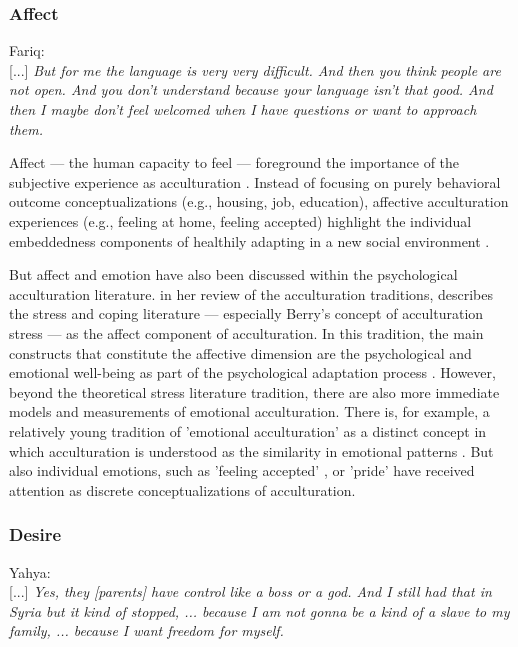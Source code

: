\documentclass[man, 12pt, a4paper, mask]{apa7}
\begin{document}
\subsubsection{Affect}
\begin{displayquote}
    Fariq:\\
    {[...]} \textit{But for me the language is very very difficult. And then you think people are not open. And you don't understand because your language isn't that good. And then I maybe don't feel welcomed when I have questions or want to approach them.}
\end{displayquote}

Affect --- the human capacity to feel \citep[including emotions and moods;][]{FeldmanBarrett2007} --- foreground the importance of the subjective experience as acculturation \citep[][]{Holodynski2012}. Instead of focusing on purely behavioral outcome conceptualizations (e.g., housing, job, education), affective acculturation experiences (e.g., feeling at home, feeling accepted) highlight the individual embeddedness components of healthily adapting in a new social environment \citep[][]{mesquita2016}. 

But affect and emotion have also been discussed within the psychological acculturation literature. \citet{Ward2001} in her review of the acculturation traditions, describes the stress and coping literature --- especially Berry's concept of acculturation stress \citep{Berry1997b} --- as the affect component of acculturation. In this tradition, the main constructs that constitute the affective dimension are the psychological and emotional well-being as part of the psychological adaptation process \citep[including, for example, life satisfaction and depression;][]{Ward2019}. However, beyond the theoretical stress literature tradition, there are also more immediate models and measurements of emotional acculturation. There is, for example, a relatively young tradition of 'emotional acculturation' as a distinct concept in which acculturation is understood as the similarity in emotional patterns \citep[see][for a review]{DeLeersnyder2017}. But also individual emotions, such as 'feeling accepted' \citep{Jasini2018}, or 'pride' \citep{Suinn1995} have received attention as discrete conceptualizations of acculturation. 

\subsubsection{Desire}
\begin{displayquote}
    Yahya:\\
    {[...]} \textit{Yes, they [parents] have control like a boss or a god. And I still had that in Syria but it kind of stopped, ... because I am not gonna be a kind of a slave to my family, ... because I want freedom for myself.}
\end{displayquote}
\end{document}

